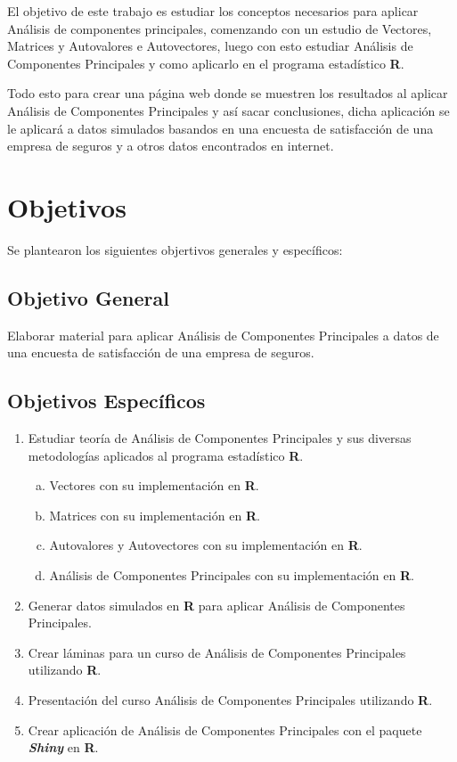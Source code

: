 \documentclass[12pt,letterpaper]{report} %
\begin{document}
El objetivo de este trabajo es estudiar los conceptos necesarios para aplicar Análisis de componentes principales, comenzando con un estudio de Vectores, Matrices y Autovalores e Autovectores, luego con esto estudiar Análisis de Componentes Principales y como aplicarlo en el programa estadístico \textbf{R}.

Todo esto para crear una página web donde se muestren los resultados al aplicar Análisis de Componentes Principales y así sacar conclusiones, dicha aplicación se le aplicará a datos simulados basandos en una encuesta de satisfacción de una empresa de seguros y a otros datos encontrados en internet.

\section{Objetivos}
Se plantearon los siguientes objertivos generales y específicos:

\subsection{Objetivo General}
Elaborar material para aplicar Análisis de Componentes Principales a datos de una encuesta de satisfacción de una empresa de seguros.

\subsection{Objetivos Específicos}

\begin{enumerate}[1.]
	\item Estudiar teoría de Análisis de Componentes Principales y sus diversas metodologías aplicados al programa estadístico \textbf{R}.
	
	\begin{enumerate}[a)]
		\item Vectores con su implementación en \textbf{R}.
		\item Matrices con su implementación en \textbf{R}.
		\item Autovalores y Autovectores con su implementación en \textbf{R}.
		\item Análisis de Componentes Principales con su implementación en \textbf{R}.
	\end{enumerate}
	
	\item Generar datos simulados en \textbf{R} para aplicar Análisis de Componentes Principales.
	\item Crear láminas para un curso de Análisis de Componentes Principales utilizando \textbf{R}.	
	\item Presentación del curso Análisis de Componentes Principales utilizando \textbf{R}.
	\item Crear aplicación de Análisis de Componentes Principales con el paquete \textbf{\textit{Shiny}} en \textbf{R}.
	
\end{enumerate}
\end{document}
